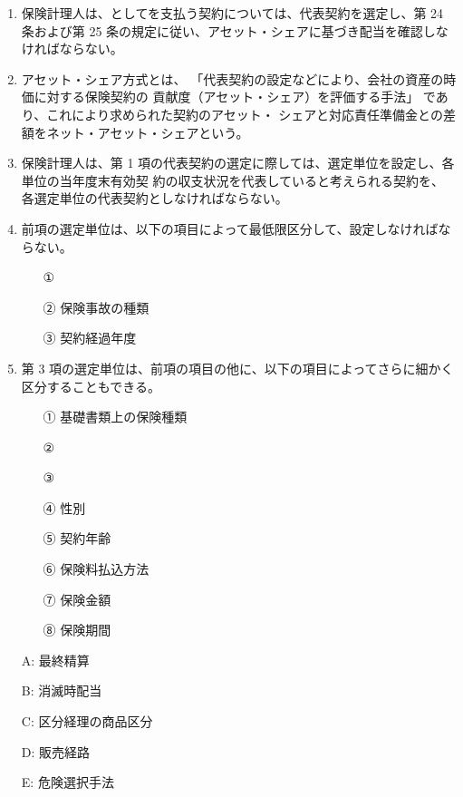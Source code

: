 \documentclass[report,gutter=10mm,fore-edge=10mm,uplatex,dvipdfmx]{jlreq}
\begin{document}
\begin{enumerate}
 \item 保険計理人は、としてを支払う契約については、代表契約を選定し、第 24 条および第 25 条の規定に従い、アセット・シェアに基づき配当を確認しなければならない。
 \item 
アセット・シェア方式とは、
「代表契約の設定などにより、会社の資産の時価に対する保険契約の
貢献度（アセット・シェア）を評価する手法」 であり、これにより求められた契約のアセット・
シェアと対応責任準備金との差額をネット・アセット・シェアという。
 \item 
保険計理人は、第 1 項の代表契約の選定に際しては、選定単位を設定し、各単位の当年度末有効契
約の収支状況を代表していると考えられる契約を、各選定単位の代表契約としなければならない。
 \item 
前項の選定単位は、以下の項目によって最低限区分して、設定しなければならない。
\begin{itemize}
 \item [①] 
 \item [②] 保険事故の種類
 \item [③] 契約経過年度
\end{itemize}
 \item 
第 3 項の選定単位は、前項の項目の他に、以下の項目によってさらに細かく区分することもできる。
\begin{itemize}
 \item [①]  基礎書類上の保険種類
 \item [②] 
\item [③] 
\item [④]  性別
\item [⑤]  契約年齢
\item [⑥]  保険料払込方法
\item [⑦]  保険金額
\item [⑧]  保険期間
\end{itemize}
\end{enumerate}
\answer{}

\begin{itemize}
\item [A: ] 最終精算
\item [B: ] 消滅時配当
\item [C: ] 区分経理の商品区分
\item [D: ] 販売経路
\item [E: ] 危険選択手法
\end{itemize}

\end{document}
